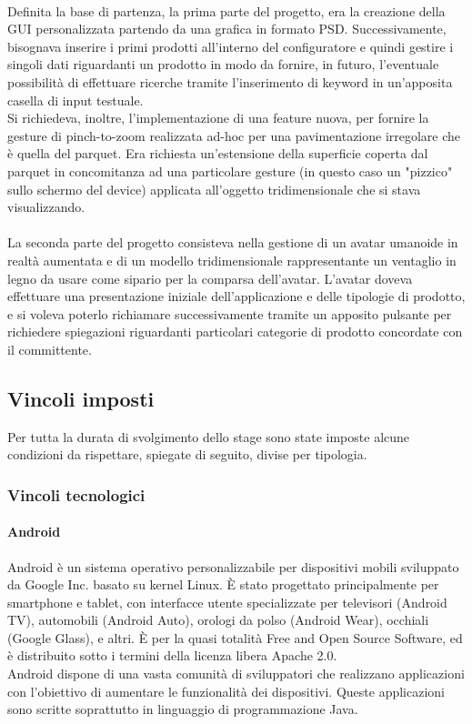 \\
Definita la base di partenza, la prima parte del progetto, era la creazione della GUI personalizzata partendo da una grafica in formato PSD. Successivamente, bisognava inserire i primi prodotti all'interno del configuratore e quindi gestire i singoli dati riguardanti un prodotto in modo da fornire, in futuro, l'eventuale possibilit\`a di effettuare ricerche tramite l'inserimento di keyword in un'apposita casella di input testuale.
\\
Si richiedeva, inoltre, l'implementazione di una feature nuova, per fornire la gesture di pinch-to-zoom realizzata ad-hoc per una pavimentazione irregolare che \`e quella del parquet. Era richiesta un'estensione della superficie coperta dal parquet in concomitanza ad una particolare gesture (in questo caso un "pizzico" sullo schermo del device) applicata all'oggetto tridimensionale che si stava visualizzando.
\\
\\
La seconda parte del progetto consisteva nella gestione di un avatar umanoide in realt\`a aumentata e di un modello tridimensionale rappresentante un ventaglio in legno da usare come sipario per la comparsa dell'avatar. L'avatar doveva effettuare una presentazione iniziale dell'applicazione e delle tipologie di prodotto, e si voleva poterlo richiamare successivamente tramite un apposito pulsante per richiedere spiegazioni riguardanti particolari categorie di prodotto concordate con il committente.

\subsection{Vincoli imposti}
Per tutta la durata di svolgimento dello stage sono state imposte alcune condizioni da rispettare, spiegate di seguito, divise per tipologia.

\subsubsection{Vincoli tecnologici}
\paragraph{Android}
Android è un sistema operativo personalizzabile per dispositivi mobili sviluppato da Google Inc. basato su kernel Linux.
È stato progettato principalmente per smartphone e tablet, con interfacce utente specializzate per televisori (Android TV), automobili (Android Auto), orologi da polso (Android Wear), occhiali (Google Glass), e altri.
È per la quasi totalità Free and Open Source Software, ed è distribuito sotto i termini della licenza libera Apache 2.0.\\
Android dispone di una vasta comunità di sviluppatori che realizzano applicazioni con l'obiettivo di aumentare le funzionalità dei dispositivi. Queste applicazioni sono scritte soprattutto in linguaggio di programmazione Java.
\\

